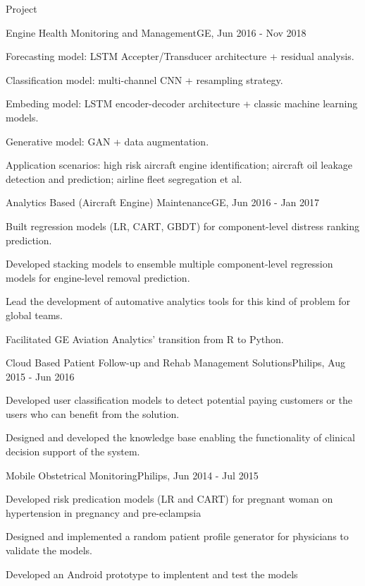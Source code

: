 \documentclass{resume} %
\begin{document}
\begin{rSection}{Project}
\begin{rSubsection}{Engine Health Monitoring and Management}{}{GE, Jun 2016 - Nov 2018}{}
\item Forecasting model: LSTM Accepter/Transducer architecture + residual analysis.
\item Classification model: multi-channel CNN + resampling strategy.
\item Embeding model: LSTM encoder-decoder architecture + classic machine learning models.
\item Generative model: GAN + data augmentation.
\item Application scenarios: high risk aircraft engine identification; aircraft oil leakage detection and prediction; airline fleet segregation et al.
\end{rSubsection}


\begin{rSubsection}{Analytics Based (Aircraft Engine) Maintenance}{}{GE, Jun 2016 - Jan 2017}{}
\item Built regression models (LR, CART, GBDT) for component-level distress ranking prediction.
\item Developed stacking models to ensemble multiple component-level regression models for engine-level removal prediction.
\item Lead the development of automative analytics tools for this kind of problem for global teams.
\item Facilitated GE Aviation Analytics' transition from R to Python.
\end{rSubsection}


\begin{rSubsection}{Cloud Based Patient Follow-up and Rehab Management Solutions}{}{Philips, Aug 2015 - Jun 2016}{}
\item Developed user classification models to detect potential paying customers or the users who can benefit from the solution.
\item Designed and developed the knowledge base enabling the functionality of clinical decision support of the system.
\end{rSubsection}


\begin{rSubsection}{Mobile Obstetrical Monitoring}{}{Philips, Jun 2014 - Jul 2015}{}
\item Developed risk predication models (LR and CART) for pregnant woman on hypertension in pregnancy and pre-eclampsia
\item Designed and implemented a random patient profile generator for physicians to validate the models.
\item Developed an Android prototype to implentent and test the models
\end{rSubsection}


\end{rSection}
\end{document}
